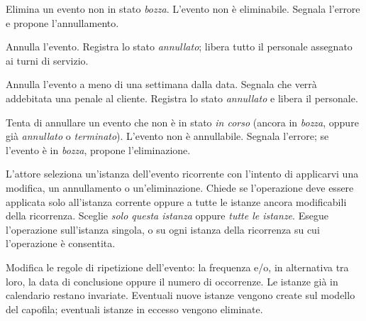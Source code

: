 
\uctablebegin
    {Elimina un evento non in stato \emph{bozza}.}
    {L'evento non è eliminabile. Segnala
     l'errore e propone l'annullamento.}
\uctableend


\uctablebegin
    {Annulla l'evento.}
    {Registra lo stato \emph{annullato}; libera tutto il personale
     assegnato ai turni di servizio.}
\uctableend


\uctablebegin
    {Annulla l'evento a meno di una settimana dalla data.}
    {Segnala che verrà addebitata una penale al cliente. Registra lo
     stato \emph{annullato} e libera il personale.}
\uctableend


\uctablebegin
    {Tenta di annullare un evento che non è in stato \emph{in corso}
     (ancora in \emph{bozza}, oppure già \emph{annullato} o
     \emph{terminato}).}
    {L'evento non è annullabile. Segnala l'errore; se l'evento è in
     \emph{bozza}, propone l'eliminazione.}
\uctableend


\uctablebegin
    {L'attore seleziona un'istanza dell'evento ricorrente con l'intento
    di applicarvi una modifica, un annullamento o un'eliminazione.}
    {Chiede se l'operazione deve essere applicata solo all'istanza
     corrente oppure a tutte le istanze ancora modificabili della
     ricorrenza.}
    {Sceglie \emph{solo questa istanza} oppure
     \emph{tutte le istanze}.}
    {Esegue l'operazione sull'istanza singola, o su ogni istanza della
     ricorrenza su cui l'operazione è consentita.}
\uctableend


\uctablebegin
    {Modifica le regole di ripetizione dell'evento: la frequenza e/o,
     in alternativa tra loro, la data di conclusione oppure il numero
     di occorrenze.}
    {Le istanze già in calendario restano invariate. Eventuali nuove
     istanze vengono create sul modello del capofila; eventuali istanze
     in eccesso vengono eliminate.}
\uctableend


